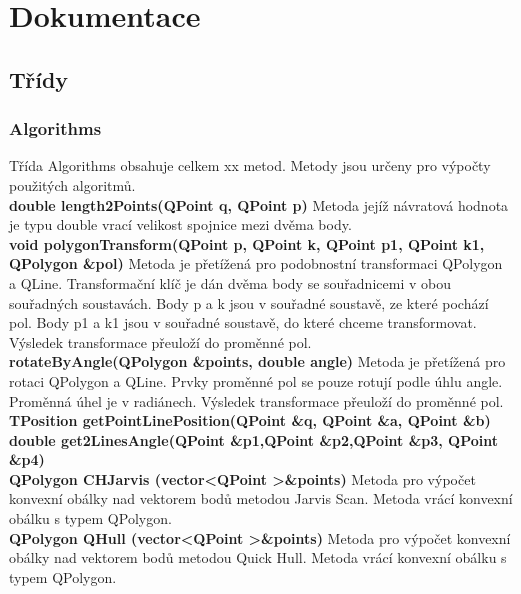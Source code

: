 \documentclass[a4paper, 12pt]{article}
\begin{document}
\clearpage

\section{Dokumentace}
\subsection{Třídy}
\subsubsection{Algorithms}
Třída Algorithms obsahuje celkem xx metod. Metody jsou určeny pro výpočty použitých algoritmů.
\\

\textbf{double length2Points(QPoint q, QPoint p)}
Metoda jejíž návratová hodnota je typu double vrací velikost spojnice mezi dvěma body.
\\

\textbf{void polygonTransform(QPoint p, QPoint k, QPoint p1, QPoint k1, QPolygon \&pol)}
Metoda je přetížená pro  podobnostní transformaci QPolygon a QLine. Transformační klíč je dán dvěma body se souřadnicemi v obou souřadných soustavách. Body p a k jsou v souřadné soustavě, ze které pochází pol. Body p1 a k1 jsou v souřadné soustavě, do které chceme transformovat. Výsledek transformace přeuloží do proměnné pol.
\\

\textbf{rotateByAngle(QPolygon \&points, double angle)}
Metoda je přetížená pro rotaci QPolygon a QLine. Prvky proměnné pol se pouze rotují podle úhlu angle. Proměnná úhel je v radiánech. Výsledek transformace přeuloží do proměnné pol.
\\

\textbf{TPosition getPointLinePosition(QPoint \&q, QPoint \&a, QPoint \&b)}
\\


\textbf{double get2LinesAngle(QPoint \&p1,QPoint \&p2,QPoint \&p3, QPoint \&p4)}
\\


\textbf{QPolygon CHJarvis (vector\textless QPoint \textgreater \&points)}
Metoda pro výpočet konvexní obálky nad vektorem bodů metodou Jarvis Scan. Metoda vrácí konvexní obálku s typem QPolygon.
\\

\textbf{QPolygon QHull (vector\textless QPoint \textgreater \&points)}
Metoda pro výpočet konvexní obálky nad vektorem bodů metodou Quick Hull. Metoda vrácí konvexní obálku s typem QPolygon.
\\
\end{document}
